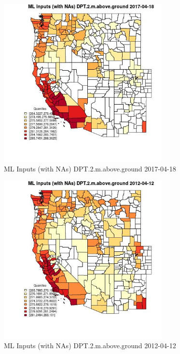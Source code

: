 \begin{figure} 
\centering  
\includegraphics[width=0.77\textwidth]{Code_Outputs/Report_ML_input_PM25_Step4_part_e_de_duplicated_aves_compiled_2019-05-14wNAs_CountyDPT2mabovegroundMean2017-04-18_2017-04-18.jpg} 
\caption{\label{fig:Report_ML_input_PM25_Step4_part_e_de_duplicated_aves_compiled_2019-05-14wNAsCountyDPT2mabovegroundMean2017-04-18_2017-04-18}ML Inputs (with NAs) DPT.2.m.above.ground 2017-04-18} 
\end{figure} 
 

\begin{figure} 
\centering  
\includegraphics[width=0.77\textwidth]{Code_Outputs/Report_ML_input_PM25_Step4_part_e_de_duplicated_aves_compiled_2019-05-14wNAs_CountyDPT2mabovegroundMean2012-04-12_2012-04-12.jpg} 
\caption{\label{fig:Report_ML_input_PM25_Step4_part_e_de_duplicated_aves_compiled_2019-05-14wNAsCountyDPT2mabovegroundMean2012-04-12_2012-04-12}ML Inputs (with NAs) DPT.2.m.above.ground 2012-04-12} 
\end{figure} 
 

